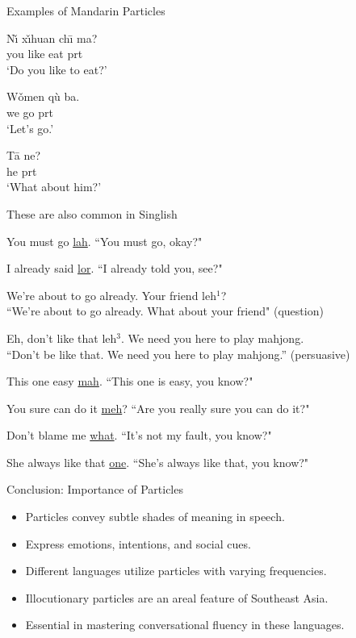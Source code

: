 \documentclass{beamer}
\newcommand{\ul}[1]{\uline{#1}}
\begin{document}
\begin{frame}{Examples of Mandarin Particles}
  \begin{example}
    \gll Nı̌ xı̌huan chı̄ ma? \\
         you like eat prt \\
    \trans ‘Do you like to eat?’
  \end{example}
  \begin{example}
    \gll Wǒmen qù ba. \\
         we go prt \\
    \trans ‘Let's go.’
  \end{example}
  \begin{example}
    \gll Tā ne? \\
         he prt \\
    \trans ‘What about him?’
  \end{example}
\end{frame}

\begin{frame}[allowframebreaks]{These are also common in Singlish}

  \ex You must go \ul{lah}. ``You must go, okay?"
\xe

\ex I already said \ul{lor}. ``I already told you, see?"
\xe

\ex  We're about to go already. Your friend  leh$^1$? \\ ``We're about to go already. What about your friend" (question)
\xe

\ex
Eh, don't like that leh$^3$. We need you here to play mahjong. \\ ``Don't be like that. We need you here to play mahjong.'' (persuasive)
\xe

\ex This one easy \ul{mah}. ``This one is easy, you know?"
\xe

\ex You sure can do it \ul{meh}? ``Are you really sure you can do it?"
\xe

\ex Don't blame me \ul{what}. ``It's not my fault, you know?"
\xe

\ex She always like that \ul{one}. ``She's always like that, you know?"
\xe

\citep{chow-etal-2024-word}
\end{frame}

\begin{frame}{Conclusion: Importance of Particles}
  \begin{itemize}
    \item Particles convey subtle shades of meaning in speech.
    \item Express emotions, intentions, and social cues.
    \item Different languages utilize particles with varying frequencies.
    \item Illocutionary particles are an areal feature of Southeast Asia.
    \item Essential in mastering conversational fluency in these languages.
  \end{itemize}
\end{frame}
\end{document}

